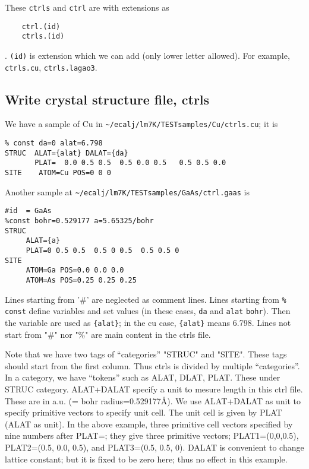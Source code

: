 \documentclass[a4paper,10pt,epsf,fleqn]{article}
\begin{document}
These \verb+ctrls+ and \verb+ctrl+ are with extensions as
\begin{verbatim}
    ctrl.(id)
    ctrls.(id)
\end{verbatim}
. \verb+(id)+ is extension which we can add
(only lower letter allowed). For example, \verb+ctrls.cu+, \verb+ctrls.lagao3+. 



\subsection{Write crystal structure file, ctrls}
\label{ctrls}

We have a sample of Cu in \verb+~/ecalj/lm7K/TESTsamples/Cu/ctrls.cu+; it is
\begin{verbatim}
% const da=0 alat=6.798
STRUC  ALAT={alat} DALAT={da}
       PLAT=  0.0 0.5 0.5  0.5 0.0 0.5   0.5 0.5 0.0
SITE    ATOM=Cu POS=0 0 0
\end{verbatim}

Another sample at \verb+~/ecalj/lm7K/TESTsamples/GaAs/ctrl.gaas+ is
\begin{verbatim}
#id  = GaAs
%const bohr=0.529177 a=5.65325/bohr 
STRUC
     ALAT={a} 
     PLAT=0 0.5 0.5  0.5 0 0.5  0.5 0.5 0 
SITE
     ATOM=Ga POS=0.0 0.0 0.0
     ATOM=As POS=0.25 0.25 0.25
\end{verbatim}

Lines starting from '\#' are neglected as comment lines.
Lines starting from \verb+% const+ define variables and set values
(in these cases, \verb+da+ and \verb+alat+ \verb+bohr+). 
Then the variable are used as \verb+{alat}+; in the cu case,
\verb+{alat}+ means 6.798.
Lines not start from "\#" nor "\%" are main content in the ctrls file.

Note that we have two tags of ``categories'' "STRUC" and "SITE". 
These tags should start from the first column. 
Thus ctrls is divided by multiple ``categories''.
In a category, we have ``tokens'' such as ALAT, DLAT, PLAT. 
These under STRUC category. 
ALAT+DALAT specify a unit to mesure length in this ctrl file.
These are in a.u. (= bohr radius=0.529177\AA). 
We use ALAT+DALAT as unit to specify primitive vectors to specify unit cell.
The unit cell is given by PLAT (ALAT as unit).
In the above example, three primitive cell vectors specified by nine
numbers after PLAT=; they give three primitive vectors;
PLAT1=(0,0,0.5), PLAT2=(0.5, 0.0, 0.5), and PLAT3=(0.5, 0.5, 0). 
DALAT is convenient to change lattice constant; but it is fixed to be
zero here; thus no effect in this example.
\end{document}
